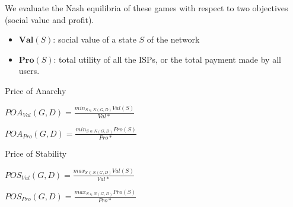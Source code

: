 \documentclass{beamer}
\begin{document}
\begin{frame}
We evaluate the Nash equilibria of these games with respect to two objectives (social value and profit).

\begin{itemize}
\item $\textbf{Val}(S)$: social value of a state $S$ of the network
\item $\textbf{Pro}(S)$: total utility of all the ISPs, or the total payment made by all users.
\end{itemize}


\begin{block}{Price of Anarchy}
\begin{center}
$POA_{Val} (G, D) = \frac{min_{S \in N (G,D)} Val(S)}{Val *}$

$POA_{Pro} (G, D) = \frac{min_{S \in N (G,D)} Pro(S)}{Pro *}$
\end{center}
\end{block}





\begin{block}{Price of Stability}
\begin{center}
$POS_{Val} (G, D) = \frac{max_{S \in N (G,D)} Val(S)}{Val *}$

$POS_{Pro} (G, D) = \frac{max_{S \in N (G,D)} Pro(S)}{Pro *}$
\end{center}
\end{block}
\end{frame}
\end{document}
